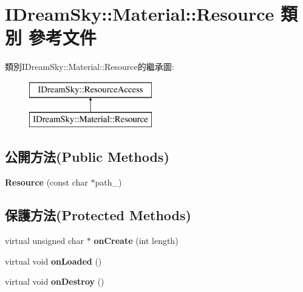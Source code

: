 \hypertarget{class_i_dream_sky_1_1_material_1_1_resource}{}\section{I\+Dream\+Sky\+:\+:Material\+:\+:Resource 類別 參考文件}
\label{class_i_dream_sky_1_1_material_1_1_resource}
類別\+I\+Dream\+Sky\+:\+:Material\+:\+:Resource的繼承圖\+:\begin{figure}[H]
\begin{center}
\leavevmode
\includegraphics[height=2.000000cm]{class_i_dream_sky_1_1_material_1_1_resource}
\end{center}
\end{figure}
\subsection*{公開方法(Public Methods)}
\begin{DoxyCompactItemize}
\item 
{\bfseries Resource} (const char $\ast$path\+\_\+)\hypertarget{class_i_dream_sky_1_1_material_1_1_resource_a2a71adc6cb46590f7e2fa612af944d07}{}\label{class_i_dream_sky_1_1_material_1_1_resource_a2a71adc6cb46590f7e2fa612af944d07}

\end{DoxyCompactItemize}
\subsection*{保護方法(Protected Methods)}
\begin{DoxyCompactItemize}
\item 
virtual unsigned char $\ast$ {\bfseries on\+Create} (int length)\hypertarget{class_i_dream_sky_1_1_material_1_1_resource_aa157c503723072f73a234839e5407325}{}\label{class_i_dream_sky_1_1_material_1_1_resource_aa157c503723072f73a234839e5407325}

\item 
virtual void {\bfseries on\+Loaded} ()\hypertarget{class_i_dream_sky_1_1_material_1_1_resource_a1e59c6c1c3d068747a4a88a88a330663}{}\label{class_i_dream_sky_1_1_material_1_1_resource_a1e59c6c1c3d068747a4a88a88a330663}

\item 
virtual void {\bfseries on\+Destroy} ()\hypertarget{class_i_dream_sky_1_1_material_1_1_resource_a1d02d515d1d7e69b038a3c5180e043bb}{}\label{class_i_dream_sky_1_1_material_1_1_resource_a1d02d515d1d7e69b038a3c5180e043bb}

\end{DoxyCompactItemize}
